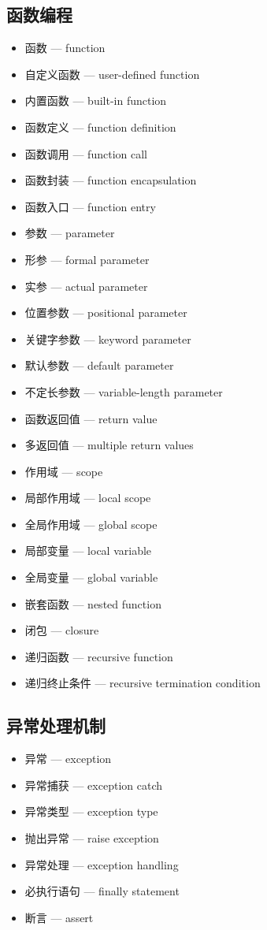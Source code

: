 \subsection{函数编程}
\begin{itemize}
\item 函数 — function
\item 自定义函数 — user-defined function
\item 内置函数 — built-in function
\item 函数定义 — function definition
\item 函数调用 — function call
\item 函数封装 — function encapsulation
\item 函数入口 — function entry
\item 参数 — parameter
\item 形参 — formal parameter
\item 实参 — actual parameter
\item 位置参数 — positional parameter
\item 关键字参数 — keyword parameter
\item 默认参数 — default parameter
\item 不定长参数 — variable-length parameter
\item 函数返回值 — return value
\item 多返回值 — multiple return values
\item 作用域 — scope
\item 局部作用域 — local scope
\item 全局作用域 — global scope
\item 局部变量 — local variable
\item 全局变量 — global variable
\item 嵌套函数 — nested function
\item 闭包 — closure
\item 递归函数 — recursive function
\item 递归终止条件 — recursive termination condition
\end{itemize}

\subsection{异常处理机制}
\begin{itemize}
\item 异常 — exception
\item 异常捕获 — exception catch
\item 异常类型 — exception type
\item 抛出异常 — raise exception
\item 异常处理 — exception handling
\item 必执行语句 — finally statement
\item 断言 — assert
\end{itemize}

